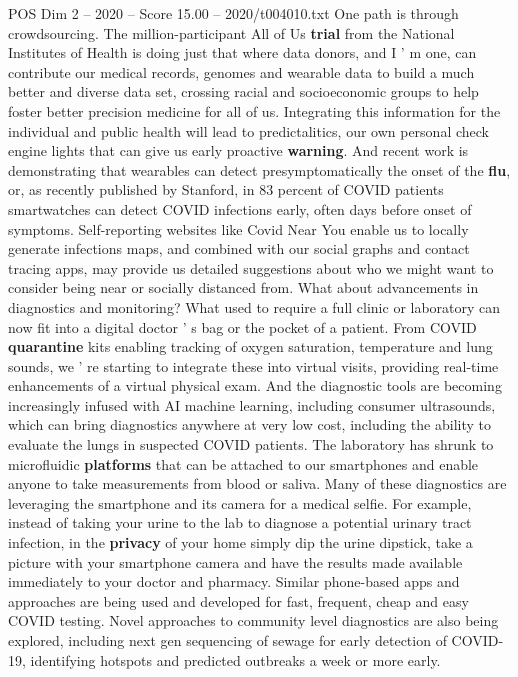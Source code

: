 \begin{textsample}{POS Dim 2 – 2020 – Score 15.00 – 2020/t004010.txt}
One path is through crowdsourcing.
The million-participant All of Us \textbf{trial} from the National Institutes of Health is doing just that where data donors, and I ' m one, can contribute our medical records, genomes and wearable data to build a much better and diverse data set, crossing racial and socioeconomic groups to help foster better precision medicine for all of us.
Integrating this information for the individual and public health will lead to predictalitics, our own personal check engine lights that can give us early proactive \textbf{warning}.
And recent work is demonstrating that wearables can detect presymptomatically the onset of the \textbf{flu}, or, as recently published by Stanford, in 83 percent of COVID patients smartwatches can detect COVID infections early, often days before onset of symptoms.
Self-reporting websites like Covid Near You enable us to locally generate infections maps, and combined with our social graphs and contact tracing apps, may provide us detailed suggestions about who we might want to consider being near or socially distanced from.
What about advancements in diagnostics and monitoring?
What used to require a full clinic or laboratory can now fit into a digital doctor ' s bag or the pocket of a patient.
From COVID \textbf{quarantine} kits enabling tracking of oxygen saturation, temperature and lung sounds, we ' re starting to integrate these into virtual visits, providing real-time enhancements of a virtual physical exam.
And the diagnostic tools are becoming increasingly infused with AI machine learning, including consumer ultrasounds, which can bring diagnostics anywhere at very low cost, including the ability to evaluate the lungs in suspected COVID patients.
The laboratory has shrunk to microfluidic \textbf{platforms} that can be attached to our smartphones and enable anyone to take measurements from blood or saliva.
Many of these diagnostics are leveraging the smartphone and its camera for a medical selfie.
For example, instead of taking your urine to the lab to diagnose a potential urinary tract infection, in the \textbf{privacy} of your home simply dip the urine dipstick, take a picture with your smartphone camera and have the results made available immediately to your doctor and pharmacy.
Similar phone-based apps and approaches are being used and developed for fast, frequent, cheap and easy COVID testing.
Novel approaches to community level diagnostics are also being explored, including next gen sequencing of sewage for early detection of COVID-19, identifying hotspots and predicted outbreaks a week or more early.

\end{textsample}
